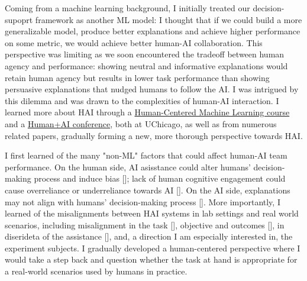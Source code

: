 



Coming from a machine learning background, I initially treated our decision-supoprt framework as another ML model: I thought that if we could build a more generalizable model, produce better explanations and achieve higher performance on some metric, we would achieve better human-AI collaboration. This perspective was limiting as we soon encountered the tradeoff between human agency and performance: showing neutral and informative explanations would retain human agency but results in lower task performance than showing persuasive explanations that nudged humans to follow the AI. 
I was intrigued by this dilemma and was drawn to the complexities of human-AI interaction. 
I learned more about HAI through a \href{https://github.com/ChicagoHAI/human-centered-machine-learning}{Human-Centered Machine Learning course} and a \href{https://datascience.uchicago.edu/events/human-ai-conference/}{Human+AI conference}, both at UChicago, as well as from numerous related papers, gradually forming a new, more thorough perspective towards HAI.

I first learned of the many "non-ML" factors that could affect human-AI team performance. On the human side, AI asisstance could alter humans' decision-making process and induce bias []; lack of human cognitive engagement could cause overreliance or underreliance towards AI []. On the AI side, explanations may not align with humans' decision-making process [].
More importantly, I learned of the misalignments between HAI systems in lab settings and real world scenarios, including misalignment in the task [], objective and outcomes [], in diserideta of the assistance [], and, a direction I am especially interested in, the experiment subjects. 
I gradually developed a human-centered perspective where I would take a step back and question whether the task at hand is appropriate for a real-world scenarios used by humans in practice. 





